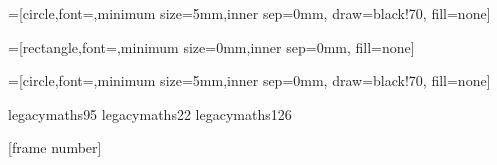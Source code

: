 =[circle,font=\small,minimum size=5mm,inner sep=0mm,
                                   draw=black!70,
                                    fill=none]

=[rectangle,font=\small,minimum size=0mm,inner sep=0mm,
                                    fill=none]

=[circle,font=\small,minimum size=5mm,inner sep=0mm,
                                   draw=black!70,
                                    fill=none]


\graphicspath{{../images/}}

\DeclareMathAccent{\dot}     {\mathalpha}{legacymaths}{95}
\DeclareMathAccent{\bar}     {\mathalpha}{legacymaths}{22}
\DeclareMathAccent{\tilde}     {\mathalpha}{legacymaths}{126}

[frame number]